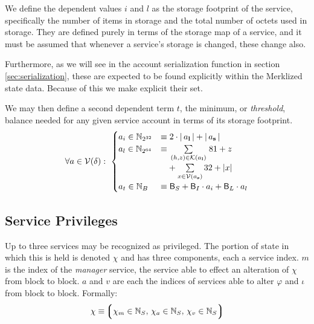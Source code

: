 We define the dependent values $i$ and $l$ as the storage footprint of the service, specifically the number of items in storage and the total number of octets used in storage. They are defined purely in terms of the storage map of a service, and it must be assumed that whenever a service's storage is changed, these change also.

Furthermore, as we will see in the account serialization function in section \ref{sec:serialization}, these are expected to be found explicitly within the Merklized state data. Because of this we make explicit their set.

We may then define a second dependent term $t$, the minimum, or \emph{threshold}, balance needed for any given service account in terms of its storage footprint.
\begin{align}
  \forall a \in \mathcal{V}(\delta):\ \begin{cases}
    a_i \in \mathbb{N}_{2^{32}} &\equiv 2\cdot|\,a_\mathbf{l}\,| + |\,a_\mathbf{s}\,| \\
    a_l \in \mathbb{N}_{2^{64}} &\equiv \sum\limits_{\,(h, z) \in \mathcal{K}(a_\mathbf{l})\,} 81 + z \\
    &\phantom{\equiv} + \sum\limits_{x \in \mathcal{V}(a_\mathbf{s})} 32 + |x| \\
    a_t \in \mathbb{N}_B &\equiv \mathsf{B}_S + \mathsf{B}_I \cdot a_i + \mathsf{B}_L \cdot a_l
  \end{cases}
\end{align}





\subsection{Service Privileges}
Up to three services may be recognized as privileged. The portion of state in which this is held is denoted $\chi$ and has three components, each a service index. $m$ is the index of the \emph{manager} service, the service able to effect an alteration of $\chi$ from block to block. $a$ and $v$ are each the indices of services able to alter $\varphi$ and $\iota$ from block to block. Formally:
\begin{align}
  \chi \equiv \ltuple\isa{\chi_m}{\N_S}\ts\isa{\chi_a}{\N_S}\ts\isa{\chi_v}{\N_S}\rtuple
\end{align}

